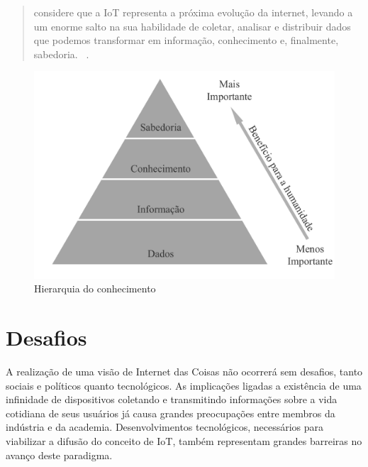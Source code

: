 \documentclass[twoside,english,brazilian]{UNISINOSmonografia}
\begin{document}
	\begin{quote}
		considere que a IoT representa a próxima evolução da internet, 
		levando a um enorme salto na sua habilidade de coletar, analisar e 
		distribuir dados que podemos transformar em informação, 
		conhecimento e, finalmente, sabedoria.~
		\cite[p.~2]{Cisco2011}.
	\end{quote}
	
	\begin{figure}
		\caption{Hierarquia do conhecimento}
		\label{fig:wkid}
		\centering
		\begin{minipage}{.8\textwidth}
			\includegraphics[width=\textwidth]{wkid}
		\end{minipage}
	\end{figure}
	
	

\section{Desafios}


A realização de uma visão de Internet das Coisas não ocorrerá sem desafios, 
tanto sociais e políticos quanto tecnológicos.
As implicações ligadas a existência de uma infinidade de dispositivos 
coletando e transmitindo informações sobre a vida cotidiana de seus usuários 
já causa grandes preocupações entre membros da indústria e da academia.
Desenvolvimentos tecnológicos, necessários para viabilizar a difusão do 
conceito de IoT, também representam grandes barreiras no avanço deste 
paradigma.
\end{document}
